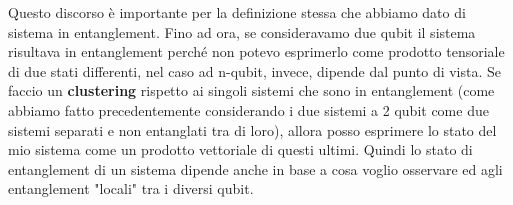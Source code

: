 Questo discorso è importante per la definizione stessa che abbiamo dato di sistema in entanglement. Fino ad ora, se consideravamo due qubit il sistema risultava in entanglement perché non potevo esprimerlo come prodotto tensoriale di due stati differenti, nel caso ad n-qubit, invece, dipende dal punto di vista. Se faccio un \textbf{clustering} rispetto ai singoli sistemi che sono in entanglement (come abbiamo fatto precedentemente considerando i due sistemi a 2 qubit come due sistemi separati e non entanglati tra di loro), allora posso esprimere lo stato del mio sistema come un prodotto vettoriale di questi ultimi. Quindi lo stato di entanglement di un sistema dipende anche in base a cosa voglio osservare ed agli entanglement "locali" tra i diversi qubit. 